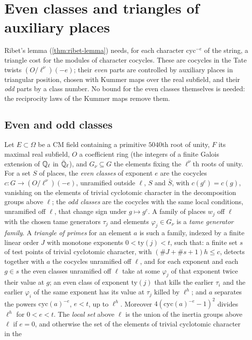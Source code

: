 \section{Even classes and triangles of auxiliary places}\label{sec:triangles}

Ribet's lemma (\cref{thm:ribet-lemma}) needs, for each character $\mathrm{cyc}^{-e}$ of the string, a triangle cost for the modules of character cocycles. These are cocycles in the
Tate twists $(O/\ell^\nu)(-e)$; their \emph{even} parts are controlled by auxiliary places in triangular position, chosen with Kummer maps over the real subfield, and their
\emph{odd} parts by a class number. No bound for the even classes themselves is needed: the reciprocity laws of the Kummer maps remove them.

\subsection{Even and odd classes}\label{ss:even-classes}
Let $E\subset\Omega$ be a CM field containing a primitive $5040$th root of unity, $F$ its maximal real subfield, $O$ a coefficient ring (the integers of a finite Galois extension of $\mathbb{Q}_\ell$ in $\bar{\mathbb{Q}}_\ell$), and
$G_\nu\subseteq G$ the elements fixing the $\ell^\nu$th roots of unity. For a set $S$ of places, the \emph{even classes} of exponent $e$ are the cocycles $c\colon G\to(O/\ell^\nu)(-e)$, unramified outside $\ell$, $S$ and $\bar S$, with
$c(g^c)=c(g)$, vanishing on the elements of trivial cyclotomic character in the decomposition groups above $\ell$; the \emph{odd classes} are the cocycles with the same local conditions, unramified off $\ell$, that
change sign under $g\mapsto g^c$. A family of places $w_j$ off $\ell$ with the chosen tame generators $\tau_j$ and elements $\varphi_j\in G_\nu$ is a \emph{tame generator family}. A \emph{triangle of primes} for an element $a$ is such a family,
indexed by a finite linear order $J$ with monotone exponents $0<\mathrm{ty}(j)<t$, such that: a finite set $s$ of test points of trivial cyclotomic character, with $(\#J+\#s+1)h\le c$, detects together with $a$ the
cocycles unramified off $\ell$, and for each exponent and each $g\in s$ the even classes unramified off $\ell$ take at some $\varphi_j$ of that exponent twice their value at $g$; an even class of exponent $\mathrm{ty}(j)$ that kills the
earlier $\tau_i$ and the earlier $\varphi_i$ of the same exponent has its value at $\tau_j$ killed by $\ell^h$; and $a$ separates the powers $\mathrm{cyc}(a)^{-e}$, $e<t$, up to $\ell^h$.
Moreover $4(\mathrm{cyc}(a)^{-e}-1)^2$ divides $\ell^h$ for $0<e<t$. The \emph{local set} above $\ell$ is the union of the inertia groups above $\ell$ if $e=0$, and otherwise the set of the elements of trivial cyclotomic character in the
